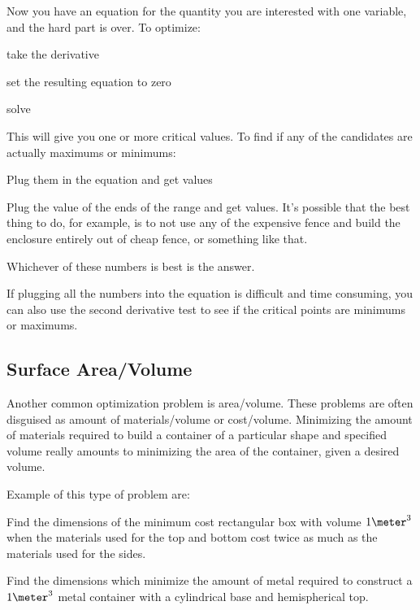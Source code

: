 \documentclass[fleqn]{exam}
\begin{document}
Now you have an equation for the quantity you are interested with one variable, and the hard part is over.  To optimize:
\begin{itemize*}
  \item take the derivative
  \item set the resulting equation to zero
  \item solve
\end{itemize*}

This will give you one or more critical values.  To find if any of the candidates are actually maximums or minimums:
\begin{itemize*}
  \item Plug them in the equation and get values
  \item Plug the value of the ends of the range and get values.  It's possible that the best thing to do, for example,
    is to not use any of the expensive fence and build the enclosure entirely out of cheap fence, or something like
    that.
  \item Whichever of these numbers is best is the answer.
\end{itemize*}

If plugging all the numbers into the equation is difficult and time consuming, you can also use the second derivative
test to see if the critical points are minimums or maximums.

\subsection{Surface Area/Volume}
Another common optimization problem is area/volume.  These problems are often disguised as amount of materials/volume or cost/volume.
Minimizing the amount of materials required to build a container of a particular
shape and specified volume really amounts to minimizing the area of the container, given a desired volume.

Example of this type of problem are:
\begin{itemize*}
  \item Find the dimensions of the minimum cost rectangular box with volume $1 \meter^3$ when the materials used for the top and bottom
    cost twice as much as the materials used for the sides.
  \item Find the dimensions which minimize the amount of metal required to construct a $1 \meter^3$ metal container with a cylindrical base and
    hemispherical top.
\end{itemize*}
\end{document}
